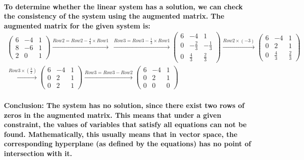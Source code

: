 \paragraph{To determine whether the linear system has a solution, we can check the consistency of the system using the augmented matrix. The augmented matrix for the given system is:
    $$
        \begin{matrix}
            \begin{pmatrix}
                6 & -4 & 1 \\
                8 & -6 & 1 \\
                2 & 0  & 1
            \end{pmatrix}
            \overset{Row2 = Row2 - \frac{4}{3} \times Row1}{\longrightarrow} \
            \overset{Row3 = Row3 - \frac{1}{3} \times Row1}{\longrightarrow}
            \begin{pmatrix}
                6 & -4           & 1            \\
                0 & -\frac{2}{3} & -\frac{1}{3} \\
                0 & \frac{4}{3}  & \frac{2}{3}
            \end{pmatrix}
            \overset{Row2 \times (-3)}{\longrightarrow}
            \begin{pmatrix}
                6 & -4          & 1           \\
                0 & 2           & 1           \\
                0 & \frac{4}{3} & \frac{2}{3}
            \end{pmatrix} \\
            \overset{Row3 \times (\frac{3}{2})}{\longrightarrow}
            \begin{pmatrix}
                6 & -4 & 1 \\
                0 & 2  & 1 \\
                0 & 2  & 1
            \end{pmatrix}
            \overset{Row3 = Row3 - Row2}{\longrightarrow}
            \begin{pmatrix}
                6 & -4 & 1 \\
                0 & 2  & 1 \\
                0 & 0  & 0
            \end{pmatrix}
        \end{matrix}
    $$}
\paragraph{\textbf{Conclusion:} The system has no solution, since there exist two rows of zeros in the augmented matrix. This means that under a given constraint, the values of variables that satisfy all equations can not be found. Mathematically, this usually means that in vector space, the corresponding hyperplane (as defined by the equations) has no point of intersection with it.}

